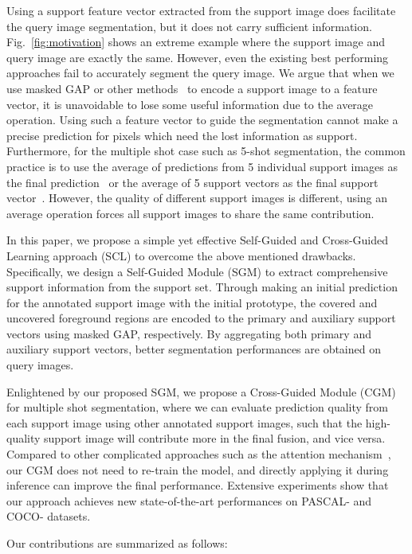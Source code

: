 \documentclass[final]{cvpr}
\begin{document}
Using a support feature vector extracted from the support image does facilitate the query image segmentation, but it does not carry sufficient information. Fig.~\ref{fig:motivation} shows an extreme example where the support image and query image are exactly the same. However, even the existing best performing approaches fail to accurately segment the query image. We argue that when we use masked GAP or other methods~\cite{nguyen2019feature} to encode a support image to a feature vector, it is unavoidable to lose some useful information due to the average operation. Using such a feature vector to guide the segmentation cannot make a precise prediction for pixels which need the lost information as support. Furthermore, for the multiple shot case such as 5-shot segmentation, the common practice is to use the average of predictions from 5 individual support images as the final prediction~\cite{zhang2020sg} or the average of 5 support vectors as the final support vector~\cite{wang2019panet}. However, the quality of different support images is different, using an average operation forces all support images to share the same contribution.

In this paper, we propose a simple yet effective Self-Guided and Cross-Guided Learning approach (SCL) to overcome the above mentioned drawbacks. Specifically, we design a Self-Guided Module (SGM) to extract comprehensive support information from the support set. Through making an initial prediction for the annotated support image with the initial prototype, the covered and uncovered foreground regions are encoded to the primary and auxiliary support vectors using masked GAP, respectively. By aggregating both primary and auxiliary support vectors, better segmentation performances are obtained on query images.

Enlightened by our proposed SGM, we propose a Cross-Guided Module (CGM) for multiple shot segmentation, where we can evaluate prediction quality from each support image using other annotated support images, such that the high-quality support image will contribute more in the final fusion, and vice versa. Compared to other complicated approaches such as the attention mechanism~\cite{zhang2019canet, zhang2019pyramid}, our CGM does not need to re-train the model, and directly applying it during inference can improve the final performance. Extensive experiments show that our approach achieves new state-of-the-art performances on PASCAL- and COCO- datasets.

Our contributions are summarized as follows: 
\end{document}
